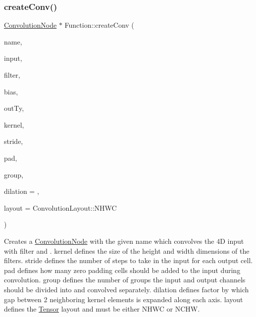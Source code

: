 \subsubsection{\texorpdfstring{create\+Conv()}{createConv()}\hspace{0.1cm}{\footnotesize\ttfamily [2/4]}}
{\footnotesize\ttfamily \hyperlink{classglow_1_1_convolution_node}{Convolution\+Node} $\ast$ Function\+::create\+Conv (\begin{DoxyParamCaption}\item[{llvm\+::\+String\+Ref}]{name,  }\item[{\hyperlink{structglow_1_1_node_value}{Node\+Value}}]{input,  }\item[{\hyperlink{structglow_1_1_node_value}{Node\+Value}}]{filter,  }\item[{\hyperlink{structglow_1_1_node_value}{Node\+Value}}]{bias,  }\item[{\hyperlink{structglow_1_1_type}{Type\+Ref}}]{out\+Ty,  }\item[{\hyperlink{namespaceglow_a0ca574644e1e42ef193a9947fb4d8911}{unsigned\+\_\+t}}]{kernel,  }\item[{\hyperlink{namespaceglow_a0ca574644e1e42ef193a9947fb4d8911}{unsigned\+\_\+t}}]{stride,  }\item[{\hyperlink{namespaceglow_a0ca574644e1e42ef193a9947fb4d8911}{unsigned\+\_\+t}}]{pad,  }\item[{\hyperlink{namespaceglow_a0ca574644e1e42ef193a9947fb4d8911}{unsigned\+\_\+t}}]{group,  }\item[{\hyperlink{namespaceglow_a0ca574644e1e42ef193a9947fb4d8911}{unsigned\+\_\+t}}]{dilation = {},  }\item[{\hyperlink{namespaceglow_aa2f3a33e05699df0f42295c5c4bd1f77}{Convolution\+Layout}}]{layout = {\ttfamily ConvolutionLayout\+:\+:NHWC} }\end{DoxyParamCaption})}

Creates a \hyperlink{classglow_1_1_convolution_node}{Convolution\+Node} with the given {\ttfamily name} which convolves the 4D {\ttfamily input} with {\ttfamily filter} and . {\ttfamily kernel} defines the size of the height and width dimensions of the filters. {\ttfamily stride} defines the number of steps to take in the input for each output cell. {\ttfamily pad} defines how many zero padding cells should be added to the input during convolution. {\ttfamily group} defines the number of groups the input and output channels should be divided into and convolved separately. {\ttfamily dilation} defines factor by which gap between 2 neighboring kernel elements is expanded along each axis. {\ttfamily layout} defines the \hyperlink{classglow_1_1_tensor}{Tensor} layout and must be either N\+H\+WC or N\+C\+HW. \mbox{\label{classglow_1_1_function_a878cada26ba13b88d149d7a631f5ae10}} 
